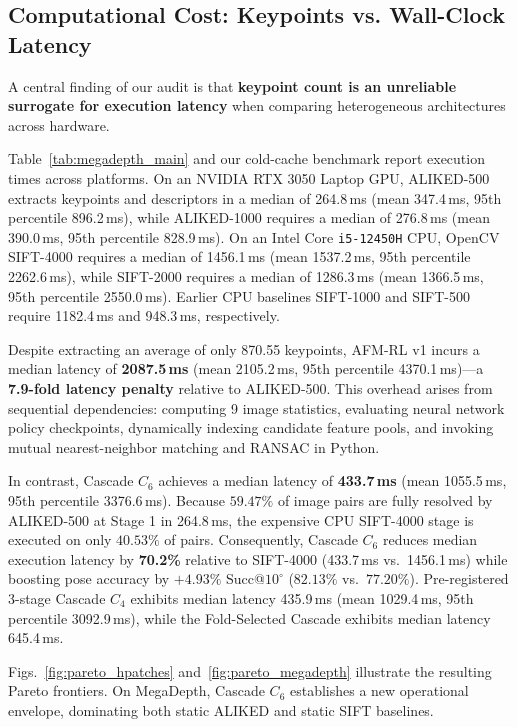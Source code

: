 \documentclass[conference]{IEEEtran}
\begin{document}
\subsection{Computational Cost: Keypoints vs. Wall-Clock Latency}
A central finding of our audit is that \textbf{keypoint count is an unreliable surrogate for execution latency} when comparing heterogeneous architectures across hardware.

Table~\ref{tab:megadepth_main} and our cold-cache benchmark report execution times across platforms. On an NVIDIA RTX 3050 Laptop GPU, ALIKED-500 extracts keypoints and descriptors in a median of 264.8\,ms (mean 347.4\,ms, 95th percentile 896.2\,ms), while ALIKED-1000 requires a median of 276.8\,ms (mean 390.0\,ms, 95th percentile 828.9\,ms). On an Intel Core \texttt{i5-12450H} CPU, OpenCV SIFT-4000 requires a median of 1456.1\,ms (mean 1537.2\,ms, 95th percentile 2262.6\,ms), while SIFT-2000 requires a median of 1286.3\,ms (mean 1366.5\,ms, 95th percentile 2550.0\,ms). Earlier CPU baselines SIFT-1000 and SIFT-500 require 1182.4\,ms and 948.3\,ms, respectively.

Despite extracting an average of only 870.55 keypoints, AFM-RL v1 incurs a median latency of \textbf{2087.5\,ms} (mean 2105.2\,ms, 95th percentile 4370.1\,ms)---a \textbf{7.9-fold latency penalty} relative to ALIKED-500. This overhead arises from sequential dependencies: computing 9 image statistics, evaluating neural network policy checkpoints, dynamically indexing candidate feature pools, and invoking mutual nearest-neighbor matching and RANSAC in Python.

In contrast, Cascade $C_6$ achieves a median latency of \textbf{433.7\,ms} (mean 1055.5\,ms, 95th percentile 3376.6\,ms). Because $59.47\%$ of image pairs are fully resolved by ALIKED-500 at Stage 1 in 264.8\,ms, the expensive CPU SIFT-4000 stage is executed on only $40.53\%$ of pairs. Consequently, Cascade $C_6$ reduces median execution latency by \textbf{70.2\%} relative to SIFT-4000 (433.7\,ms vs.\ 1456.1\,ms) while boosting pose accuracy by $+4.93\%$ Succ@$10^\circ$ ($82.13\%$ vs.\ $77.20\%$). Pre-registered 3-stage Cascade $C_4$ exhibits median latency 435.9\,ms (mean 1029.4\,ms, 95th percentile 3092.9\,ms), while the Fold-Selected Cascade exhibits median latency 645.4\,ms.

Figs.~\ref{fig:pareto_hpatches} and~\ref{fig:pareto_megadepth} illustrate the resulting Pareto frontiers. On MegaDepth, Cascade $C_6$ establishes a new operational envelope, dominating both static ALIKED and static SIFT baselines.
\end{document}
